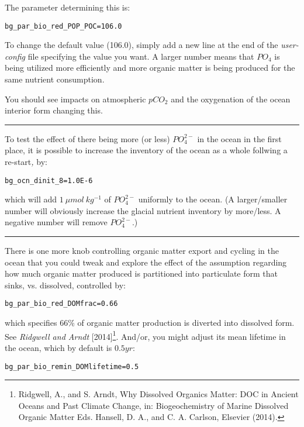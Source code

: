 \documentclass[11pt,fleqn]{book} %
\begin{document}
The parameter determining this is:
\vspace{-2mm}\small\begin{verbatim}
bg_par_bio_red_POP_POC=106.0
\end{verbatim}\normalsize\vspace{-2mm}
To change the default value (106.0), simply add a new line at the end of the \textit{user-config} file specifying the value you want. A larger number means that \(PO_{4}\) is being utilized more efficiently and more organic matter is being produced for the same nutrient consumption.

You should see impacts on atmospheric \(pCO_{2}\) and the oxygenation of the ocean interior form changing this.

\vspace{1mm}
\noindent\rule{4cm}{0.5pt}
\vspace{2mm}

\noindent To test the effect of there being more (or less) \(PO^{2-}_{4}\) in the ocean in the first place, it is possible to increase the inventory of the ocean as a whole follwing a re-start\textit{, }by:
\vspace{-2mm}\small\begin{verbatim}
bg_ocn_dinit_8=1.0E-6
\end{verbatim}\normalsize\vspace{-2mm}
which will add \(1\:\mu mol\:kg^{-1}\) of \(PO^{2-}_{4}\) uniformly to the ocean. (A larger/smaller number will obviously increase the glacial nutrient inventory by more/less. A negative number will remove \(PO^{2-}_{4}\).)


\vspace{1mm}
\noindent\rule{4cm}{0.5pt}
\vspace{2mm}

\noindent There is one more knob controlling organic matter export and cycling in the ocean that you could tweak and explore the effect of the assumption regarding how much organic matter produced is partitioned into particulate form that sinks, vs. dissolved, controlled by:
\vspace{-2mm}\small\begin{verbatim}
bg_par_bio_red_DOMfrac=0.66
\end{verbatim}\normalsize\vspace{-2mm}
which specifies 66\% of organic matter production is diverted into dissolved form. See \textit{Ridgwell and Arndt} [2014]\footnote{Ridgwell, A., and S. Arndt, Why Dissolved Organics Matter: DOC in Ancient Oceans and Past Climate Change, in: Biogeochemistry of Marine Dissolved Organic Matter Eds. Hansell, D. A., and C. A. Carlson, Elsevier (2014).}. And/or, you might adjust its mean lifetime in the ocean, which by default is  \(0.5 yr\):
\vspace{-2mm}\small\begin{verbatim}
bg_par_bio_remin_DOMlifetime=0.5
\end{verbatim}\normalsize\vspace{-2mm}
\end{document}
